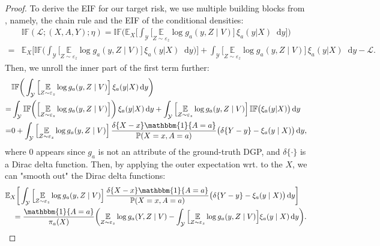 \documentclass[dvipsnames]{article} %
\newcommand*\diff{\mathop{}\!\mathrm{d}}
\begin{document}
\begin{proof}
    To derive the EIF for our target risk, we use multiple building blocks from \citet{kennedy2024semiparametric}, namely, the chain rule and the EIF of the conditional densities:
    \begin{align}
        & \mathbb{IF}(\mathcal{L}; (X, A, Y); {\eta}) = \mathbb{IF} \bigg(\mathbb{E}_X \bigg[ \int_\mathcal{Y} \Big[\underset{Z \sim \varepsilon_z }{\mathbb{E}} \log g_a(y, Z \mid V) \Big] \, \xi_a(y | X) \diff{y} \bigg]\bigg) \\
        = & \mathbb{E}_X \bigg[  \mathbb{IF} \bigg(\int_\mathcal{Y} \Big[\underset{Z \sim \varepsilon_z }{\mathbb{E}} \log g_a(y, Z \mid V) \Big] \, \xi_a(y | X) \diff{y}\bigg) \bigg] +  \int_\mathcal{Y} \Big[\underset{Z \sim \varepsilon_z }{\mathbb{E}} \log g_a(y, Z \mid V) \Big]  \, \xi_a(y | X) \diff{y} - \mathcal{L}.
    \end{align}
    Then, we unroll the inner part of the first term further:
    \begin{align}
        & \mathbb{IF} \bigg(\int_\mathcal{Y} \Big[\underset{Z \sim \varepsilon_z }{\mathbb{E}} \log g_a(y, Z \mid V) \Big] \, \xi_a(y | X) \diff{y}\bigg) \\
         = & \int_\mathcal{Y} \mathbb{IF} \bigg(\Big[\underset{Z \sim \varepsilon_z }{\mathbb{E}} \log g_a(y, Z \mid V) \Big] \bigg)\, \xi_a(y | X) \diff{y} + \int_\mathcal{Y} \Big[\underset{Z \sim \varepsilon_z }{\mathbb{E}} \log g_a(y, Z \mid V) \Big] \, \mathbb{IF} \big( \xi_a(y | X) \big)\diff{y} \\
        = & 0 + \int_\mathcal{Y} \Big[\underset{Z \sim \varepsilon_z }{\mathbb{E}} \log g_a(y, Z \mid V) \Big] \, \frac{\delta\{X - x\} \mathbbm{1}\{A = a\}}{\mathbb{P}(X=x, A=a)}\big(\delta\{Y - y\} - \xi_a(y\mid X)\big) \diff{y},
    \end{align}
    where $0$ appears since $g_a$ is not an attribute of the ground-truth DGP, and $\delta\{\cdot\}$ is a Dirac delta function.
    Then, by applying the outer expectation wrt. to the $X$, we can "smooth out" the Dirac delta functions:
    \begin{align}
        & \mathbb{E}_X \bigg[\int_\mathcal{Y} \Big[\underset{Z \sim \varepsilon_z }{\mathbb{E}} \log g_a(y, Z \mid V) \Big] \, \frac{\delta\{X - x\} \mathbbm{1}\{A = a\}}{\mathbb{P}(X=x, A=a)}\big(\delta\{Y - y\} - \xi_a(y\mid X)\big) \diff{y} \bigg] \\
        & \quad = \frac{\mathbbm{1}\{A = a\}}{\pi_a(X)} \bigg(\underset{Z \sim \varepsilon_z }{\mathbb{E}} \log g_a(Y, Z \mid V) - \int_\mathcal{Y} \Big[\underset{Z \sim \varepsilon_z }{\mathbb{E}} \log g_a(y, Z \mid V)\Big] \xi_a(y\mid X) \diff{y}\bigg).

\end{align}
\end{proof}
\end{document}
